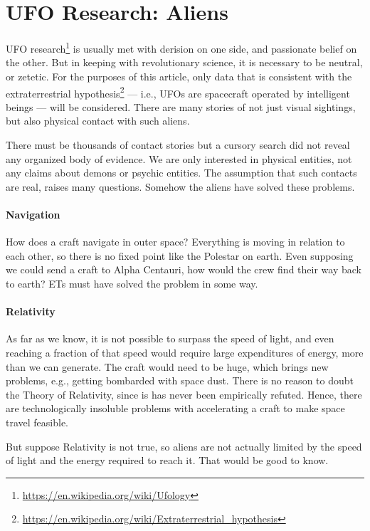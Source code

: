 \section{UFO Research: Aliens}

UFO research\footnote{\url{https://en.wikipedia.org/wiki/Ufology}} is usually met with derision on one side, and passionate belief on the other. But in keeping with revolutionary science, it is necessary to be neutral, or zetetic. For the purposes of this article, only data that is consistent with the extraterrestrial hypothesis\footnote{\url{https://en.wikipedia.org/wiki/Extraterrestrial\_hypothesis}} --- i.e., UFOs are spacecraft operated by intelligent beings --- will be considered. There are many stories of not just visual sightings, but also physical contact with such aliens.

There must be thousands of contact stories but a cursory search did not reveal any organized body of evidence. We are only interested in physical entities, not any claims about demons or psychic entities. The assumption that such contacts are real, raises many questions. Somehow the aliens have solved these problems.

\paragraph{Navigation}


How does a craft navigate in outer space? Everything is moving in relation to each other, so there is no fixed point like the Polestar on earth. Even supposing we could send a craft to Alpha Centauri, how would the crew find their way back to earth? ETs must have solved the problem in some way.

\paragraph{Relativity}


As far as we know, it is not possible to surpass the speed of light, and even reaching a fraction of that speed would require large expenditures of energy, more than we can generate. The craft would need to be huge, which brings new problems, e.g., getting bombarded with space dust. There is no reason to doubt the Theory of Relativity, since is has never been empirically refuted. Hence, there are technologically insoluble problems with accelerating a craft to make space travel feasible.

But suppose Relativity is not true, so aliens are not actually limited by the speed of light and the energy required to reach it. That would be good to know.

